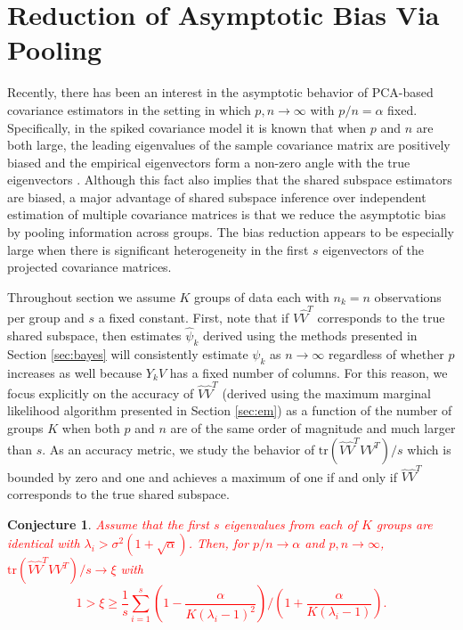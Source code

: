\documentclass{statsoc}
\newcommand{\tr}{\text{tr}}
\newtheorem{conjecture}{Conjecture}
\newcommand{\edits}[1]{{\textsf{\textcolor{red}{#1}}}}
\begin{document}
\section{Reduction of Asymptotic Bias Via Pooling}
\label{sec:asymp}
Recently, there has been an interest in the asymptotic behavior of
PCA-based covariance estimators in the setting in which
$p, n \to \infty$ with $p/n=\alpha$ fixed.  Specifically, in the
spiked covariance model it is known that when $p$ and $n$ are both
large, the leading eigenvalues of the sample covariance matrix are
positively biased and the empirical eigenvectors form a non-zero angle
with the true eigenvectors \citep{Baik2006, Paul2007}.  Although this
fact also implies that the shared subspace estimators are biased, a
major advantage of shared subspace inference over independent
estimation of multiple covariance matrices is that we reduce the
asymptotic bias by pooling information across groups.  The bias
reduction appears to be especially large when there is significant heterogeneity
in the first $s$ eigenvectors of the projected covariance matrices.

Throughout section we assume $K$ groups of data each with $n_k = n$
observations per group and $s$ a fixed constant.  First, note that if
$\hat{V}\hat{V}^T$ corresponds to the true shared subspace, then
estimates $\hat{\psi}_k$ derived using the methods presented in
Section \ref{sec:bayes} will consistently estimate $\psi_k$ as
$n \to \infty$ regardless of whether $p$ increases as well because
$Y_kV$ has a fixed number of columns.  For this reason, we focus
explicitly on the accuracy of $\hat{V}\hat{V}^T$ (derived using the
maximum marginal likelihood algorithm presented in Section
\ref{sec:em}) as a function of the number of groups $K$ when both $p$
and $n$ are of the same order of magnitude and much larger than $s$.
As an accuracy metric, we study the behavior of
$\tr(\hat{V}\hat{V}^TVV^T)/s$ which is bounded by zero and one
and achieves a maximum of one if and only if $\hat{V}\hat{V}^T$
corresponds to the true shared subspace.

\begin{conjecture}
\edits{Assume that the first $s$ eigenvalues from each of $K$ groups are
  identical with $\lambda_i > \sigma^2(1 + \sqrt{\alpha})$.  Then,
 for $p/n \to \alpha$ and $p, n
  \to \infty$,  $\tr(\hat{V}\hat{V}^TVV^T)/s \to \xi$ with  
\begin{equation}1 > \xi \geq  \frac{1}{s}\sum_{i=1}^s  \left(1-\frac{\alpha}{K(\lambda_i - 1)^2}\right) /\left(1 +
    \frac{\alpha}{K(\lambda_i - 1)}\right).
\label{eqn:asympBound}
\end{equation}  }
\end{conjecture}
\end{document}

